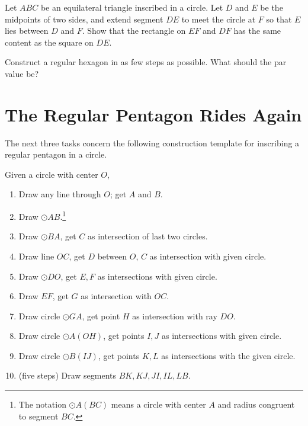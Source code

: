 \begin{problem}\label{prob:inscribed-circle-content}
Let $ABC$ be an equilateral triangle inscribed in a circle. Let $D$ and $E$ be the midpoints of two sides, and extend segment $DE$ to meet the circle at $F$ so that $E$ lies between $D$ and $F$. Show that the rectangle on $EF$ and $DF$ has the same content as the square on $DE$.
\end{problem}


\begin{challenge}\label{chal:hexagon}
Construct a regular hexagon in as few steps as possible. What should the par value be?
\end{challenge}


\chapter{The Regular Pentagon Rides Again}


The next three tasks concern the following construction template for inscribing a regular pentagon in a circle. 



Given a circle with center $O$,
\begin{enumerate}
\item Draw any line through $O$; get $A$ and $B$.
\item Draw $\odot AB$.\footnote{The notation $\odot A(BC)$ means a circle with center $A$ and radius congruent to segment $BC$.}
\item Draw $\odot BA$, get $C$ as intersection of last two circles.
\item Draw line $OC$, get $D$ between $O$, $C$ as intersection with given circle.
\item Draw $\odot DO$, get $E, F$ as intersections with given circle.
\item Draw $EF$, get $G$ as intersection with $OC$.
\item Draw circle $\odot GA$, get point $H$ as intersection with ray $DO$.
\item Draw circle $\odot A(OH)$, get points $I, J$ as intersections with given circle.
\item Draw circle $\odot B(IJ)$, get points $K, L$ as intersections with the given circle.
\item (five steps) Draw segments $BK, KJ, JI, IL, LB$.
\end{enumerate}


